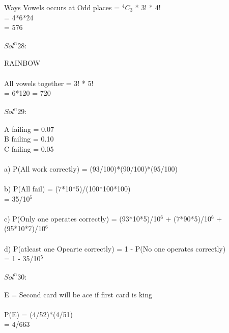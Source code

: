 \documentclass{article}
\begin{document}
Ways Vowels occurs at Odd places = $^4C_3$ * 3! * 4! \\
= 4*6*24\\
= 576\\\\
\textbf{$Sol^n 28:$} \\ \\
RAINBOW \\\\
All vowels together = 3! * 5! \\
= 6*120 = 720 \\\\
\textbf{$Sol^n 29:$} \\ \\
A failing = 0.07 \\
B failing = 0.10 \\
C failing = 0.05 \\\\
a) P(All work correctly) = (93/100)*(90/100)*(95/100) \\\\
b) P(All fail) = (7*10*5)/(100*100*100)\\
= 35/10$^5$\\\\
c) P(Only one operates correctly) = (93*10*5)/10$^6$ + (7*90*5)/10$^6$ + (95*10*7)/10$^6$ \\\\
d) P(atleast one Opearte correctly) = 1 - P(No one operates correctly) \\
= 1 - 35/10$^5$ \\\\
\textbf{$Sol^n 30:$} \\ \\
E = Second card will be ace if first card is king\\\\
P(E) = (4/52)*(4/51) \\
= 4/663 \\\
\end{document}
